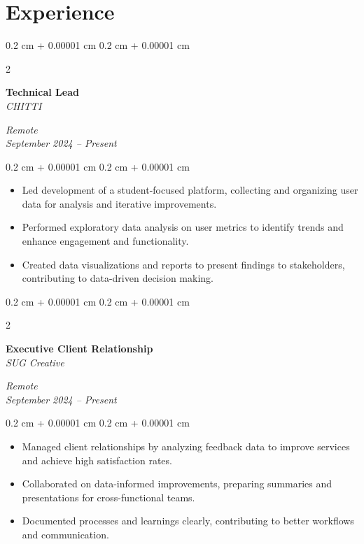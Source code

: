 \documentclass[10pt, letterpaper]{article}
\newenvironment{highlights}{
    \begin{itemize}[
        topsep=0.10 cm,
        parsep=0.10 cm,
        partopsep=0pt,
        itemsep=0pt,
        leftmargin=0.4 cm + 10pt
    ]
}{
    \end{itemize}
} %
\newenvironment{onecolentry}{
    \begin{adjustwidth}{
        0.2 cm + 0.00001 cm
    }{
        0.2 cm + 0.00001 cm
    }
}{
    \end{adjustwidth}
} %
\newenvironment{twocolentry}[2][]{
    \onecolentry
    \def\secondColumn{#2}
    \setcolumnwidth{\fill, 4.5 cm}
    \begin{paracol}{2}
}{
    \switchcolumn \raggedleft \secondColumn
    \end{paracol}
    \endonecolentry
} %
\begin{document}
    \section{Experience}
    \begin{twocolentry}{
        \textit{Remote} \\
        \textit{September 2024 – Present}
    }
        \textbf{Technical Lead} \\
        \textit{CHITTI}
    \end{twocolentry}
    \vspace{0.10 cm}
    \begin{onecolentry}
        \begin{highlights}
            \item Led development of a student-focused platform, collecting and organizing user data for analysis and iterative improvements.
            \item Performed exploratory data analysis on user metrics to identify trends and enhance engagement and functionality.
            \item Created data visualizations and reports to present findings to stakeholders, contributing to data-driven decision making.
        \end{highlights}
    \end{onecolentry}
    \vspace{0.2 cm}
    \begin{twocolentry}{
        \textit{Remote} \\
        \textit{September 2024 – Present}
    }
        \textbf{Executive Client Relationship} \\
        \textit{SUG Creative}
    \end{twocolentry}
    \vspace{0.10 cm}
    \begin{onecolentry}
        \begin{highlights}
            \item Managed client relationships by analyzing feedback data to improve services and achieve high satisfaction rates.
            \item Collaborated on data-informed improvements, preparing summaries and presentations for cross-functional teams.
            \item Documented processes and learnings clearly, contributing to better workflows and communication.
        \end{highlights}
    \end{onecolentry}
\end{document}
